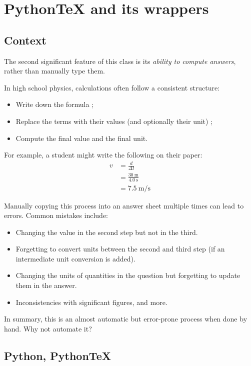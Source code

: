 \documentclass[12pt,code]{HSP-Test}
\begin{document}
	\section{PythonTeX and its wrappers}
	\label{sec:PythonTex}
	\subsection{Context}
	\label{subsec:pythonTex_context}
	The second significant feature of this class is its \emph{ability to compute answers}, rather than manually type them.
	
	In high school physics, calculations often follow a consistent structure:
	\begin{itemize}
		\item Write down the formula ;
		\item Replace the terms with their values (and optionally their unit) ;
		\item Compute the final value and the final unit.
	\end{itemize}
	
	For example, a student might write the following on their paper:
	\begin{align*}
		v&=\frac{d}{\Delta t}\\
		 &=\frac{\SI{30}{\meter}}{\SI{4.0}{\second}}\\
		 &=\SI{7.5}{\meter\per\second}
	\end{align*}
	
	Manually copying this process into an answer sheet multiple times can lead to errors. Common mistakes include:
	\begin{itemize}
		\item Changing the value in the second step but not in the third.
		\item Forgetting to convert units between the second and third step (if an intermediate unit conversion is added).
		\item Changing the units of quantities in the question but forgetting to update them in the answer.
		\item Inconsistencies with significant figures, and more.
	\end{itemize}
	In summary, this is an almost automatic but error-prone process when done by hand. Why not automate it?
	
	\subsection{Python, Python\TeX}
\end{document}

